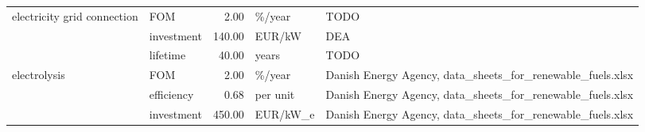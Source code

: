 \begin{longtable}{p{5cm}p{3cm}rp{3cm}p{11cm}}
electricity grid connection & FOM &           2.00 &                            \%/year &                                                                                                                                                                                                                                                                                                                                 TODO \\
                      & investment &         140.00 &                            EUR/kW &                                                                                                                                                                                                                                                                                                                                  DEA \\
                      & lifetime &          40.00 &                             years &                                                                                                                                                                                                                                                                                                                                 TODO \\
electrolysis & FOM &           2.00 &                            \%/year &                                                                                                                                                                                                                                                                           Danish Energy Agency, data\_sheets\_for\_renewable\_fuels.xlsx \\
                      & efficiency &           0.68 &                          per unit &                                                                                                                                                                                                                                                                           Danish Energy Agency, data\_sheets\_for\_renewable\_fuels.xlsx \\
                      & investment &         450.00 &                          EUR/kW\_e &                                                                                                                                                                                                                                                                           Danish Energy Agency, data\_sheets\_for\_renewable\_fuels.xlsx \\

\end{longtable}
